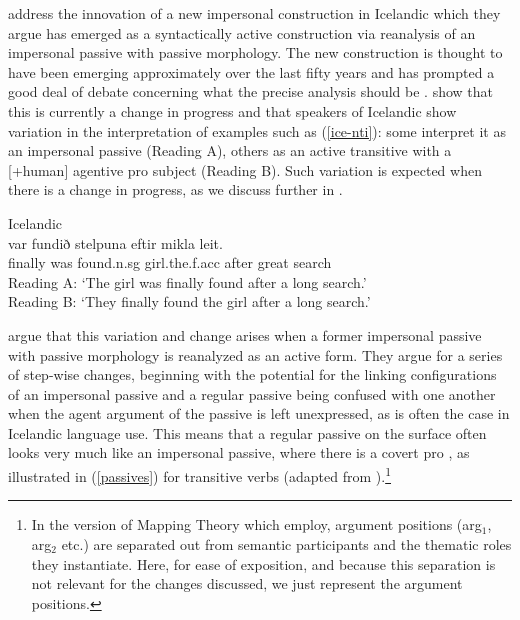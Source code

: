 \documentclass[output=paper,hidelinks]{langscibook}
\begin{document}
\citet{KM15} address the innovation of a new impersonal construction in Icelandic which they argue has emerged as a syntactically active construction via reanalysis of an impersonal passive with passive morphology. %
The new construction is thought to have been emerging approximately over the last fifty years  \citep{Thrainsson07} and has prompted a good deal of debate concerning what the precise analysis should be \citep{MS02,Eythorsson08,Jonsson2009}. 
\citet{MS02} show that this is currently a change in progress and that speakers of Icelandic show  variation in the interpretation of examples such as (\ref{ice-nti}): some interpret it as an impersonal passive (Reading A), others as an active transitive with a [+human] agentive {\sc pro} subject (Reading B).  Such variation is expected when there is a change in progress, as we discuss further in .


\ea Icelandic\label{ice-nti}\\
 {var} {fundið} {stelpuna} {eftir} {mikla} {leit.} \\
{finally} {was} {found.{\sc n.sg}} {girl.the.{\sc f.acc}} {after} {great} {search} \\
\glt Reading A: ‘The girl was finally found after a long search.’ \\
Reading B: ‘They finally found the girl after a long search.’
\z



\citet{KM15} argue that this variation and change arises when a former impersonal passive with passive morphology is reanalyzed as an active form.  They argue for a series of step-wise changes, beginning with the potential for the linking configurations of an impersonal passive and a regular passive being confused with one another when the \OBLTHETA agent argument of the passive is left unexpressed, as is often the case in Icelandic language use.  This means that a regular passive on the surface often looks very much like an impersonal passive, where there is a covert {\sc pro} \SUBJ, as  illustrated in (\ref{passives}) for transitive verbs (adapted from \citealp{KM15}).\footnote{In the version of Mapping Theory which \citet{KM15} employ, argument positions (arg$_{1}$, arg$_{2}$ etc.) are separated out from semantic participants and the thematic roles they instantiate. Here, for ease of exposition, and because this separation is not relevant for the changes discussed, we just represent the argument positions.} 
\end{document}
